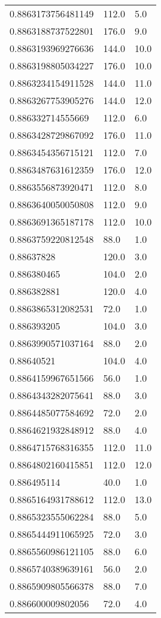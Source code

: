 \begin{center}
\begin{supertabular}[H]{p{0.30\textwidth}p{0.05\textwidth}p{0.05\textwidth}}
0.8863173756481149 & 112.0 & 5.0 \\ 
0.8863188737522801 & 176.0 & 9.0 \\ 
0.8863193969276636 & 144.0 & 10.0 \\ 
0.8863198805034227 & 176.0 & 10.0 \\ 
0.8863234154911528 & 144.0 & 11.0 \\ 
0.8863267753905276 & 144.0 & 12.0 \\ 
0.886332714555669 & 112.0 & 6.0 \\ 
0.8863428729867092 & 176.0 & 11.0 \\ 
0.8863454356715121 & 112.0 & 7.0 \\ 
0.8863487631612359 & 176.0 & 12.0 \\ 
0.8863556873920471 & 112.0 & 8.0 \\ 
0.8863640050050808 & 112.0 & 9.0 \\ 
0.8863691365187178 & 112.0 & 10.0 \\ 
0.8863759220812548 & 88.0 & 1.0 \\ 
0.88637828 & 120.0 & 3.0 \\ 
0.886380465 & 104.0 & 2.0 \\ 
0.886382881 & 120.0 & 4.0 \\ 
0.8863865312082531 & 72.0 & 1.0 \\ 
0.886393205 & 104.0 & 3.0 \\ 
0.8863990571037164 & 88.0 & 2.0 \\ 
0.88640521 & 104.0 & 4.0 \\ 
0.8864159967651566 & 56.0 & 1.0 \\ 
0.8864343282075641 & 88.0 & 3.0 \\ 
0.8864485077584692 & 72.0 & 2.0 \\ 
0.8864621932848912 & 88.0 & 4.0 \\ 
0.8864715768316355 & 112.0 & 11.0 \\ 
0.8864802160415851 & 112.0 & 12.0 \\ 
0.886495114 & 40.0 & 1.0 \\ 
0.8865164931788612 & 112.0 & 13.0 \\ 
0.8865323555062284 & 88.0 & 5.0 \\ 
0.8865444911065925 & 72.0 & 3.0 \\ 
0.8865560986121105 & 88.0 & 6.0 \\ 
0.8865740389639161 & 56.0 & 2.0 \\ 
0.8865909805566378 & 88.0 & 7.0 \\ 
0.886600009802056 & 72.0 & 4.0 \\ 

\end{supertabular}
\end{center}

